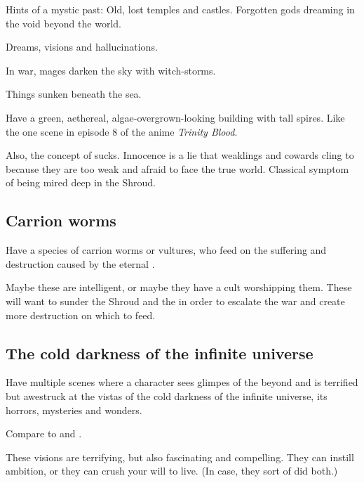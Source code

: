 Hints of a mystic past: 
Old, lost temples and castles. 
Forgotten gods dreaming in the void beyond the world. 

Dreams, visions and hallucinations. 

In war, mages darken the sky with witch-storms. 

Things sunken beneath the sea.

Have a green, aethereal, algae-overgrown-looking building with tall spires. Like the one scene in episode 8 of the anime \emph{Trinity Blood}. 

Also, the concept of  sucks. Innocence is a lie that weaklings and cowards cling to because they are too weak and afraid to face the true world. Classical symptom of being mired deep in the Shroud. 







\subsection{Carrion worms}
Have a species of carrion worms or vultures, who feed on the suffering and destruction caused by the eternal . 

Maybe these are intelligent, or maybe they have a cult worshipping them. These will want to sunder the Shroud and the \charade{} in order to escalate the war and create more destruction on which to feed. 







\subsection{The cold darkness of the infinite universe}
Have multiple scenes where a character sees glimpes of the beyond and is terrified but awestruck at the vistas of the cold darkness of the infinite universe, its horrors, mysteries and wonders. 

Compare to  and . 

These visions are terrifying, but also fascinating and compelling. They can instill ambition, or they can crush your will to live. (In  case, they sort of did both.)

